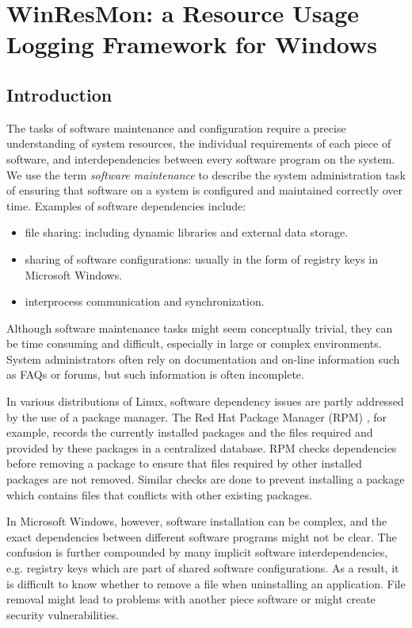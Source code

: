 \chapter{WinResMon: a Resource Usage Logging Framework for Windows}

\section{Introduction}


The tasks of software maintenance and configuration require a precise
understanding of system resources, the individual requirements of each piece
of software, and interdependencies between every software program on the
system.  We use the term {\em software maintenance} to describe the system
administration task of ensuring that software on a system is configured and
maintained correctly over time.  Examples of software dependencies include:

\begin{itemize}
\item file sharing: including dynamic libraries and external data storage.
\item sharing of software configurations: usually in the form of registry keys
in Microsoft Windows.
\item interprocess communication and synchronization.
\end{itemize}

Although software maintenance tasks might seem conceptually trivial, they can
be time consuming and difficult, especially in large or complex environments.
System administrators often rely on documentation and on-line information such
as FAQs or forums, but such information is often incomplete.

In various distributions of Linux, software dependency issues are partly
addressed by the use of a package manager.  The Red Hat Package Manager (RPM)
\cite{rpm}, for example, records the currently installed packages and the
files required and provided by these packages in a centralized database.  RPM
checks dependencies before removing a package to ensure that files required by
other installed packages are not removed.  Similar checks are done to prevent
installing a package which contains files that conflicts with other existing
packages.

In Microsoft Windows, however, software installation can be complex, and the
exact dependencies between different software programs might not be clear.
The confusion is further compounded by many implicit software
interdependencies, e.g. registry keys which are part of shared software
configurations.  As a result, it is difficult to know whether to remove a file
when uninstalling an application.  File removal might lead to problems with
another piece software or might create security vulnerabilities.  

